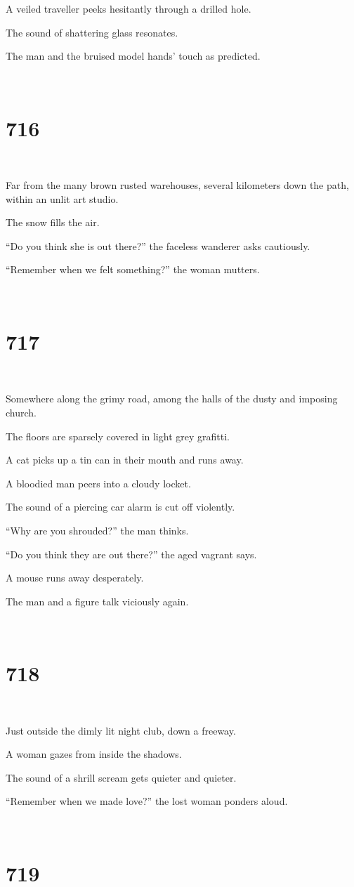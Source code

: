\documentclass{report}
\begin{document}
A veiled traveller peeks hesitantly through a drilled hole.

The sound of shattering glass resonates.

The man and the bruised model hands' touch as predicted.

~
\chapter*{716}
~

Far from the many brown rusted warehouses, several kilometers down the path, within an unlit art studio.

The snow fills the air.

``Do you think she is out there?'' the faceless wanderer asks cautiously.

``Remember when we felt something?'' the woman mutters.

~
\chapter*{717}
~

Somewhere along the grimy road, among the halls of the dusty and imposing church.

The floors are sparsely covered in light grey grafitti.

A cat picks up a tin can in their mouth and runs away.

A bloodied man peers into a cloudy locket.

The sound of a piercing car alarm is cut off violently.

``Why are you shrouded?'' the man thinks.

``Do you think they are out there?'' the aged vagrant says.

A mouse runs away desperately.

The man and a figure talk viciously again.

~
\chapter*{718}
~

Just outside the dimly lit night club, down a freeway.

A woman gazes from inside the shadows.

The sound of a shrill scream gets quieter and quieter.

``Remember when we made love?'' the lost woman ponders aloud.

~
\chapter*{719}
~
\end{document}
